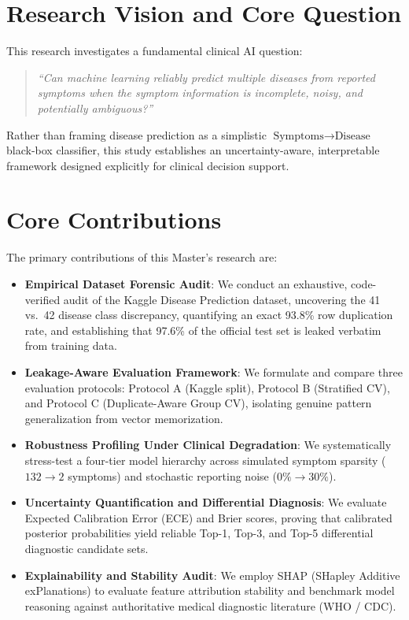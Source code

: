 \section{Research Vision and Core Question}
\label{sec:research_vision}
This research investigates a fundamental clinical AI question:
\begin{quote}
\emph{``Can machine learning reliably predict multiple diseases from reported symptoms when the symptom information is incomplete, noisy, and potentially ambiguous?''}
\end{quote}

Rather than framing disease prediction as a simplistic $\text{Symptoms} \to \text{Disease}$ black-box classifier, this study establishes an uncertainty-aware, interpretable framework designed explicitly for clinical decision support.

\section{Core Contributions}
\label{sec:contributions}
The primary contributions of this Master's research are:
\begin{itemize}
    \item \textbf{Empirical Dataset Forensic Audit}: We conduct an exhaustive, code-verified audit of the Kaggle Disease Prediction dataset, uncovering the 41 vs.\ 42 disease class discrepancy, quantifying an exact 93.8\% row duplication rate, and establishing that 97.6\% of the official test set is leaked verbatim from training data.
    \item \textbf{Leakage-Aware Evaluation Framework}: We formulate and compare three evaluation protocols: Protocol A (Kaggle split), Protocol B (Stratified CV), and Protocol C (Duplicate-Aware Group CV), isolating genuine pattern generalization from vector memorization.
    \item \textbf{Robustness Profiling Under Clinical Degradation}: We systematically stress-test a four-tier model hierarchy across simulated symptom sparsity ($132 \to 2$ symptoms) and stochastic reporting noise ($0\% \to 30\%$).
    \item \textbf{Uncertainty Quantification and Differential Diagnosis}: We evaluate Expected Calibration Error (ECE) and Brier scores, proving that calibrated posterior probabilities yield reliable Top-1, Top-3, and Top-5 differential diagnostic candidate sets.
    \item \textbf{Explainability and Stability Audit}: We employ SHAP (SHapley Additive exPlanations) to evaluate feature attribution stability and benchmark model reasoning against authoritative medical diagnostic literature (WHO / CDC).
\end{itemize}
